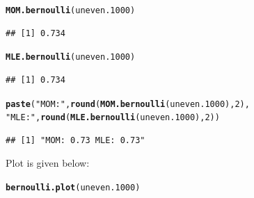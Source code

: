 \documentclass{article}\usepackage[]{graphicx}\usepackage[]{color}
\makeatletter
\newcommand{\hlnum}[1]{\textcolor[rgb]{0.686,0.059,0.569}{#1}}%
\newcommand{\hlstr}[1]{\textcolor[rgb]{0.192,0.494,0.8}{#1}}%
\newcommand{\hlstd}[1]{\textcolor[rgb]{0.345,0.345,0.345}{#1}}%
\newcommand{\hlkwd}[1]{\textcolor[rgb]{0.737,0.353,0.396}{\textbf{#1}}}%
\newenvironment{kframe}{%
 \def\at@end@of@kframe{}%
 \ifinner\ifhmode%
  \def\at@end@of@kframe{\end{minipage}}%
  \begin{minipage}{\columnwidth}%
 \fi\fi%
 \def\FrameCommand##1{\hskip\@totalleftmargin \hskip-\fboxsep
 \colorbox{shadecolor}{##1}\hskip-\fboxsep
     \hskip-\linewidth \hskip-\@totalleftmargin \hskip\columnwidth}%
 \MakeFramed {\advance\hsize-\width
   \@totalleftmargin\z@ \linewidth\hsize
   \@setminipage}}%
 {\par\unskip\endMakeFramed%
 \at@end@of@kframe}
\newenvironment{knitrout}{}{} %
\makeatother
\begin{document}
\begin{enumerate}
\begin{enumerate}
\begin{knitrout}
\begin{kframe}
\begin{alltt}
\hlkwd{MOM.bernoulli}\hlstd{(uneven.1000)}
\end{alltt}
\begin{verbatim}
## [1] 0.734
\end{verbatim}
\begin{alltt}
\hlkwd{MLE.bernoulli}\hlstd{(uneven.1000)}
\end{alltt}
\begin{verbatim}
## [1] 0.734
\end{verbatim}
\begin{alltt}
\hlkwd{paste}\hlstd{(}\hlstr{"MOM:"}\hlstd{,} \hlkwd{round}\hlstd{(}\hlkwd{MOM.bernoulli}\hlstd{(uneven.1000),}\hlnum{2}\hlstd{),}
      \hlstr{"MLE:"}\hlstd{,} \hlkwd{round}\hlstd{(}\hlkwd{MLE.bernoulli}\hlstd{(uneven.1000),} \hlnum{2}\hlstd{))}
\end{alltt}
\begin{verbatim}
## [1] "MOM: 0.73 MLE: 0.73"
\end{verbatim}
\end{kframe}
\end{knitrout}
Plot is given below:
\begin{knitrout}
\color{fgcolor}\begin{kframe}
\begin{alltt}
\hlkwd{bernoulli.plot}\hlstd{(uneven.1000)}
\end{alltt}
\end{kframe}
\end{knitrout}


\end{enumerate}
\end{enumerate}
\end{document}

